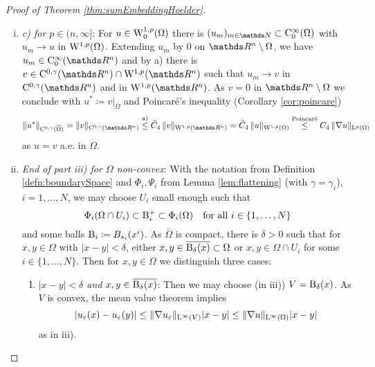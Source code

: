 \begin{proof}[Proof of Theorem \ref{thm:sumEmbeddingHoelder}]
\begin{enumerate}[i)]
  \item \emph{c) for $p \in (n,\infty]$}:
    For $u \in \mathrm{W}_0^{1,p}(\Omega)$ there is $(u_m)_{m \in \N} \subset \CC_0^\infty(\Omega)$ with $u_m \to u$ in $\mathrm{W}^{1,p}(\Omega)$.
    Extending $u_m$ by $0$ on $\R^n \setminus \Omega$, we have $u_m \in \CC_0^\infty(\R^n)$ and by a) there is $v \in \CC^{0,\gamma}(\R^n) \cap \WW^{1,p}(\R^n)$ such that $u_m \to v$ in $\CC^{0,\gamma}(\R^n)$ and in $\WW^{1,p}(\R^n)$.
    As $v = 0$ in $\R^n \setminus \Omega$ we conclude with $u^* \coloneqq v|_{\overline\Omega}$ and Poincar\'e's inequality (Corollary \ref{cor:poincare})
    $$
    \|u^*\|_{\CC^{0,\gamma}(\overline\Omega)}
    = \|v\|_{\CC^{0,\gamma}(\R^n)}
    \overset{\text{a)}}{\leq} \tilde C_4 \, \|v\|_{\WW^{1,p}(\R^n)}
    = \tilde C_4 \, \|u\|_{\WW^{1,p}(\Omega)}
    \overset{\text{Poincar\'e}}{\leq} C_4 \, \|\nabla u\|_{\Ell^p(\Omega)}
    $$
    as $u = v$ a.e. in $\Omega$.

    \item \emph{End of part iii) for $\Omega$ non-convex}:
      With the notation from Definition \ref{defn:boundarySpace} and $\Phi_i, \Psi_i$ from Lemma \ref{lem:flattening} (with $\gamma = \gamma_i$), $i = 1,\dots,N$, we may choose $U_i$ small enough such that 
      $$\Phi_i(\Omega \cap U_i) \subset \mathrm{B}_i^+ \subset \Phi_i(\Omega)\quad\text{for all } i \in \{1,\dots,N\}$$ and some balls $\mathrm{B}_i \coloneqq B_{s_i}(x^i)$.
      As $\overline\Omega$ is compact, there is $\delta > 0$ such that for $x,y \in \Omega$ with $|x - y| < \delta$, either $x,y \in \overline{\mathrm{B}_\delta(x)} \subset \Omega$ or $x, y \in \Omega \cap U_i$ for some $i \in \{1,\dots,N\}$.
      Then for $x,y \in \Omega$ we distinguish three cases:
      \begin{enumerate}[I)]
        \item \emph{$|x -y| < \delta$ and $x,y \in \overline{\mathrm{B}_\delta(x)}$}:
          Then we may choose (in iii)) $V = \mathrm{B}_\delta(x)$.
          As $V$ is convex, the mean value theorem implies 
          $$
          |u_\varepsilon(x) - u_\varepsilon(y)| 
          \leq \| \nabla u_\varepsilon\|_{\mathrm{L}^\infty(V)} |x - y|
          \leq \| \nabla u\|_{\mathrm{L}^\infty(\Omega)} |x - y|
          $$
          as in iii).


\end{enumerate}
\end{enumerate}
\end{proof}
